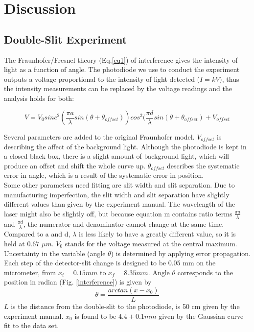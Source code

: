 \documentclass[prb,preprint]{revtex4-1}
\begin{document}
\section{Discussion}

\subsection{Double-Slit Experiment}

The Fraunhofer/Fresnel theory (Eq.\ref{eq1}) of interference gives the intensity of light as a function of angle. The photodiode we use to conduct the experiment outputs a voltage proportional to the intensity of light detected ($I = kV$), thus the intensity measurements can be replaced by the voltage readings and the analysis holds for both:

\begin{equation}
V=V_0 sinc^2( \frac{\pi a}{\lambda} sin (\theta+\theta_{offset}))  cos^2(\frac{\pi d}{\lambda} sin (\theta+\theta_{offset}) + V_{offset}
\label{fitdouble}
\end{equation}

Several parameters are added to the original Fraunhofer model. $V_{offset}$ is describing the affect of the background light. Although the photodiode is kept in a closed black box, there is a slight amount of background light, which will produce an offset and shift the whole curve up. $\theta_{offset}$ describes the systematic error in angle, which is a result of the systematic error in position.\\

Some other parameters need fitting are slit width and slit separation. Due to manufacturing imperfection, the slit width and slit separation have slightly different values than given by the experiment manual. The wavelength of the laser might also be slightly off, but because equation m contains ratio terms $\frac{\pi a}{\lambda}$ and $\frac{\pi d}{\lambda}$, the numerator and denominator cannot change at the same time. Compared to a and d, $\lambda$ is less likely to have a greatly different value, so it is held at 0.67 $\mu m$. $V_{0}$ stands for the voltage measured at the central maximum.\\

Uncertainty in the variable (angle $\theta$) is determined by applying error propagation. Each step of the detector-slit change is designed to be 0.05 mm on the micrometer, from $x_i = 0.15 mm$ to $x_f = 8.35 mm$. Angle $\theta$ corresponds to the position in radian (Fig. \ref{interference}) is given by
\begin{equation}
\theta = \frac{arctan(x-x_0)}{L}
\label{theta}
\end{equation}
$L$ is the distance from the double-slit to the photodiode, is 50 cm given by the experiment manual.
$x_0$ is found to be $4.4 \pm 0.1mm$ given by the Gaussian curve fit to the data set.
\end{document}
